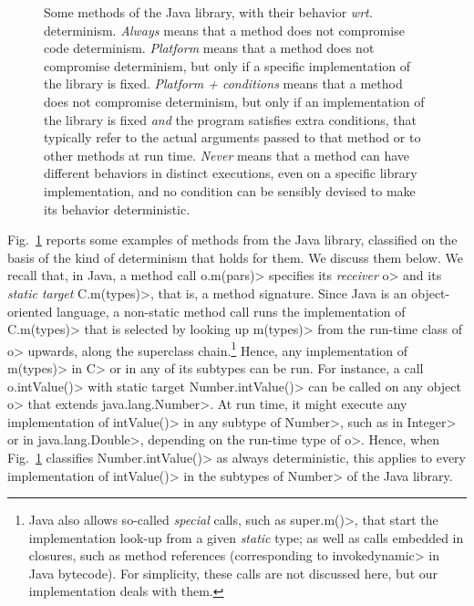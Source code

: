 \begin{figure}[t]
\begin{center}
\begin{tabular}{|l||C{1cm}|C{1.25cm}|C{1.57cm}|C{1cm}|}
    \end{tabular}
  \end{center}
  \caption{Some methods of the Java library, with their behavior \emph{wrt.} determinism.
\emph{Always} means that a method does not compromise code determinism.
\emph{Platform} means that
a method does not compromise determinism, but only if a specific implementation
of the library is fixed. \emph{Platform + conditions} means that a method
does not compromise determinism, but only if an implementation of the library is fixed
\emph{and} the program satisfies extra conditions, that typically refer to
the actual arguments passed to that method or to other methods at run time.
\emph{Never} means
that a method can have different behaviors in distinct executions,
even on a specific library implementation, and no
condition can be sensibly devised to make its behavior deterministic.}\label{fig:determinism}
\end{figure}

Fig.~\ref{fig:determinism} reports some examples of methods
from the Java library, classified
on the basis of the kind of determinism that holds for them.
We discuss them below. We recall that, in Java, a method call
\<o.m(pars)> specifies its \emph{receiver} \<o> and
its \emph{static target} \<C.m(types)>, that is, a method signature.
Since Java is an object-oriented language,
a non-static method call runs the implementation of \<C.m(types)>
that is selected by looking up \<m(types)> from the run-time class of \<o> upwards,
along the superclass chain.\footnote{Java also allows so-called \emph{special} calls, such as
   \<super.m()>, that start the implementation look-up from a given \emph{static}
   type; as well as calls embedded in closures, such as method references
   (corresponding to \<invokedynamic> in Java bytecode). For simplicity,
   these calls are not discussed here, but our implementation deals with them.}
Hence, any implementation of \<m(types)> in \<C> or in any of its
subtypes can be run. For instance, a call \<o.intValue()> with static target \<Number.intValue()>
can be called on any object \<o> that extends
\<java.lang.Number>. At run time, it might
execute any implementation of \<intValue()> in any subtype of \<Number>,
such as in \<Integer> or in \<java.lang.Double>, depending on the run-time type of \<o>.
Hence, when Fig.~\ref{fig:determinism} classifies \<Number.intValue()> as always
deterministic, this applies to every implementation of
\<intValue()> in the subtypes of \<Number> of the Java library.

